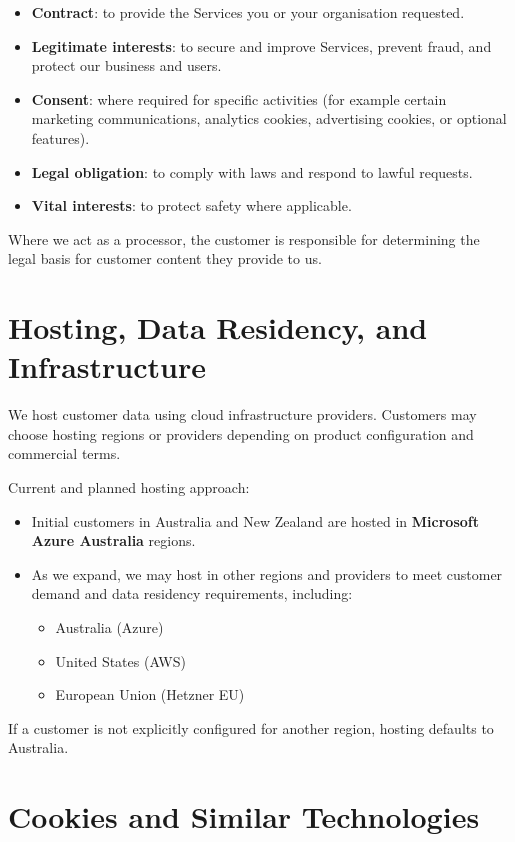 \documentclass[11pt]{article}
\begin{document}
\begin{itemize}
\item \textbf{Contract}: to provide the Services you or your organisation requested.
\item \textbf{Legitimate interests}: to secure and improve Services, prevent fraud, and protect our business and users.
\item \textbf{Consent}: where required for specific activities (for example certain marketing communications, analytics cookies, advertising cookies, or optional features).
\item \textbf{Legal obligation}: to comply with laws and respond to lawful requests.
\item \textbf{Vital interests}: to protect safety where applicable.
\end{itemize}

Where we act as a processor, the customer is responsible for determining the legal basis for customer content they provide to us.

\section{Hosting, Data Residency, and Infrastructure}

We host customer data using cloud infrastructure providers. Customers may choose hosting regions or providers depending on product configuration and commercial terms.

Current and planned hosting approach:

\begin{itemize}
\item Initial customers in Australia and New Zealand are hosted in \textbf{Microsoft Azure Australia} regions.
\item As we expand, we may host in other regions and providers to meet customer demand and data residency requirements, including:
  \begin{itemize}
  \item Australia (Azure)
  \item United States (AWS)
  \item European Union (Hetzner EU)
  \end{itemize}
\end{itemize}

If a customer is not explicitly configured for another region, hosting defaults to Australia.

\section{Cookies and Similar Technologies}
\end{document}
